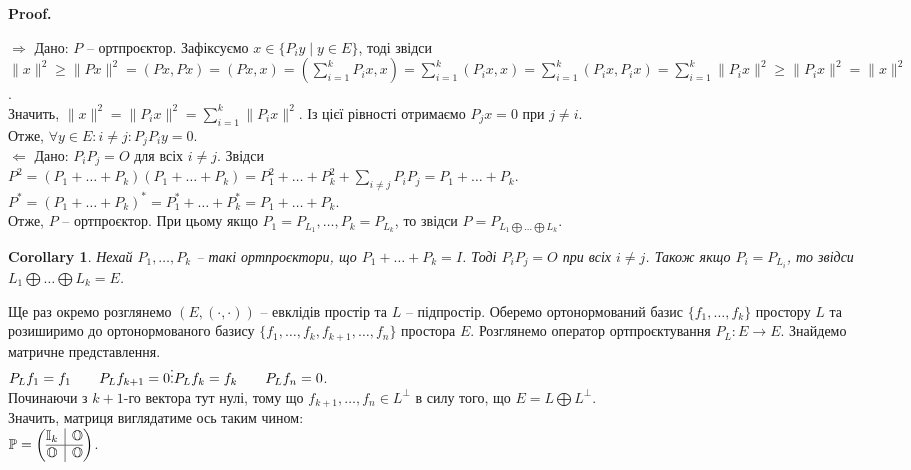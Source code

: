 \documentclass[a4paper, 10pt]{article}
\makeatletter
\def\rightproof{$\boxed{\Rightarrow}$ }
\def\leftproof{$\boxed{\Leftarrow}$ }
\theoremstyle{theoremdd}
\newtheorem{corollary}[theorem]{Corollary}
\renewenvironment{proof}[1][Proof.\\]{\par
\pushQED{\hfill \qed}%
\normalfont \topsep6\p@\@plus6\p@\relax
\trivlist
\item\relax
{\bfseries
#1\@addpunct{.}}\hspace\labelsep\ignorespaces
}{%
\popQED\endtrivlist\@endpefalse
}
\makeatother
\begin{document}
\begin{proof}
\rightproof Дано: $P$ -- ортпроєктор. Зафіксуємо $x \in \{P_{i} y \mid y \in E\}$, тоді звідси\\
$\|x\|^2 \geq \|Px\|^2 = (Px,Px) = (Px,x) = \displaystyle\left( \sum_{i=1}^k P_i x, x \right) = \sum_{i=1}^k (P_i x, x) = \sum_{i=1}^k (P_i x, P_i x) = \sum_{i=1}^k \|P_i x\|^2 \geq \| P_i x \|^2 = \|x\|^2$.\\
Значить, $\|x\|^2 = \|P_i x\|^2 = \displaystyle\sum_{i=1}^k \|P_i x\|^2$. Із цієї рівності отримаємо $P_j x = 0$ при $j \neq i$.\\
Отже, $\forall y \in E: i \neq j: P_j P_i y = 0$.
\bigskip \\
\leftproof Дано: $P_i P_j = O$ для всіх $i \neq j$. Звідси\\
$\displaystyle P^2 = (P_1 + \dots + P_k)(P_1 + \dots + P_k) = P_1^2 + \dots + P_k^2 + \sum_{i \neq j} P_i P_j = P_1 + \dots + P_k$.\\
$P^* = (P_1 + \dots + P_k)^* = P_1^* + \dots + P_k^* = P_1 + \dots + P_k$.\\
Отже, $P$ -- ортпроєктор. При цьому якщо $P_1 = P_{L_1},\dots, P_k = P_{L_k}$, то звідси $P = P_{L_1 \bigoplus \dots \bigoplus L_k}$.
\end{proof}

\begin{corollary}
Нехай $P_1,\dots,P_k$ -- такі ортпроєктори, що $P_1 + \dots + P_k = I$. Тоді $P_i P_j = O$ при всіх $i \neq j$. Також якщо $P_i = P_{L_i}$, то звідси $L_1 \bigoplus \dots \bigoplus L_k = E$.
\end{corollary}
\noindent
Ще раз окремо розглянемо $(E,(\cdot,\cdot))$ -- евклідів простір та $L$ -- підпростір. Оберемо ортонормований базис $\{f_1,\dots,f_k\}$ простору $L$ та розиширимо до ортонормованого базису $\{f_1,\dots,f_k,f_{k+1},\dots,f_n\}$ простора $E$.  Розглянемо оператор ортпроєктування $P_L \colon E \to E$. Знайдемо матричне представлення.\\
$P_L f_1 = f_1 \qquad P_L f_{k+1} = 0\\
\vdots \\
P_L f_k = f_k \qquad P_L f_n = 0
$.\\
Починаючи з $k+1$-го вектора тут нулі, тому що $f_{k+1},\dots,f_n \in L^\perp$ в силу того, що $E = L \bigoplus L^\perp$.\\
Значить, матриця виглядатиме ось таким чином:\\
$\mathbb{P} = \left(\begin{array}{@{}c|c@{}}
\mathbb{I}_k & \mathbb{O} \\
\hline
\mathbb{O} & \mathbb{O}
\end{array}\right)$.
\end{document}
